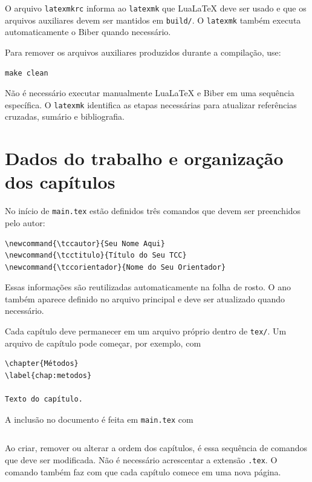 O arquivo \verb|latexmkrc| informa ao \verb|latexmk| que LuaLaTeX deve ser usado e que os arquivos auxiliares devem ser mantidos em \verb|build/|. O \verb|latexmk| também executa automaticamente o Biber quando necessário.

Para remover os arquivos auxiliares produzidos durante a compilação, use:

\begin{verbatim}
make clean
\end{verbatim}

Não é necessário executar manualmente LuaLaTeX e Biber em uma sequência específica. O \verb|latexmk| identifica as etapas necessárias para atualizar referências cruzadas, sumário e bibliografia.

\section{Dados do trabalho e organização dos capítulos}
\label{sec:dados_organizacao}

No início de \verb|main.tex| estão definidos três comandos que devem ser preenchidos pelo autor:

\begin{verbatim}
\newcommand{\tccautor}{Seu Nome Aqui}
\newcommand{\tcctitulo}{Título do Seu TCC}
\newcommand{\tccorientador}{Nome do Seu Orientador}
\end{verbatim}

Essas informações são reutilizadas automaticamente na folha de rosto. O ano também aparece definido no arquivo principal e deve ser atualizado quando necessário.

Cada capítulo deve permanecer em um arquivo próprio dentro de \verb|tex/|. Um arquivo de capítulo pode começar, por exemplo, com

\begin{verbatim}
\chapter{Métodos}
\label{chap:metodos}

Texto do capítulo.
\end{verbatim}

A inclusão no documento é feita em \verb|main.tex| com

\begin{verbatim}

\end{verbatim}

Ao criar, remover ou alterar a ordem dos capítulos, é essa sequência de comandos \verb|| que deve ser modificada. Não é necessário acrescentar a extensão \verb|.tex|. O comando \verb|| também faz com que cada capítulo comece em uma nova página.

